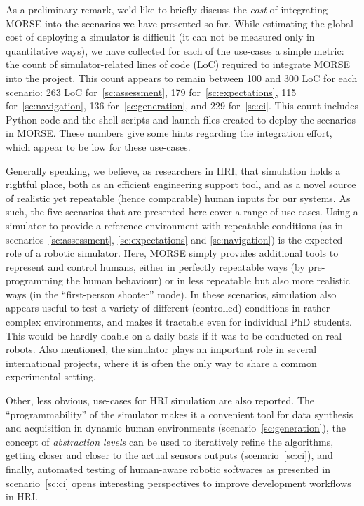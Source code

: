 \documentclass[letterpaper, 10pt, conference]{ieeeconf}
\begin{document}
As a preliminary remark, we'd like to briefly discuss the \emph{cost} of
integrating MORSE into the scenarios we have presented so far. While estimating
the global cost of deploying a simulator is difficult (it can not be measured
only in quantitative ways), we have collected for each of the use-cases a simple
metric: the count of simulator-related lines of code ({\sc LoC}) required to
integrate MORSE into the project. This count appears to remain between 100 and
300 {\sc LoC} for each scenario: 263 {\sc LoC} for~\ref{sc:assessment}, 179
for~\ref{sc:expectations}, 115 for~\ref{sc:navigation}, 136
for~\ref{sc:generation}, and 229 for~\ref{sc:ci}.  This count includes Python
code and the shell scripts and launch files created to deploy the scenarios in
MORSE. These numbers give some hints regarding the integration effort, which
appear to be low for these use-cases.

Generally speaking, we believe, as researchers in HRI,  that simulation holds a
rightful place, both as an efficient engineering support tool, and as a novel
source of realistic yet repeatable (hence comparable) human inputs for our
systems. As such, the five scenarios that are presented here cover a range of
use-cases.  Using a simulator to provide a reference environment with repeatable
conditions (as in scenarios~\ref{sc:assessment}, \ref{sc:expectations} and
\ref{sc:navigation}) is the expected role of a robotic simulator. Here, MORSE
simply provides additional tools to represent and control humans, either in
perfectly repeatable ways (by pre-programming the human behaviour) or in less
repeatable but also more realistic ways (in the ``first-person shooter'' mode).
In these scenarios, simulation also appears useful to test a variety of
different (controlled) conditions in rather complex environments, and makes it
tractable even for individual PhD students. This would be hardly doable on a
daily basis if it was to be conducted on real robots.  Also mentioned, the
simulator plays an important role in several international projects, where it is
often the only way to share a common experimental setting.

Other, less obvious, use-cases for HRI simulation are also reported. The
``programmability'' of the simulator makes it a convenient tool for data
synthesis and acquisition in dynamic human environments
(scenario~\ref{sc:generation}), the concept of \emph{abstraction levels} can be
used to iteratively refine the algorithms, getting closer and closer to the
actual sensors outputs (scenario~\ref{sc:ci}), and finally, automated testing of
human-aware robotic softwares as presented in scenario~\ref{sc:ci} opens
interesting perspectives to improve development workflows in HRI.
\end{document}
